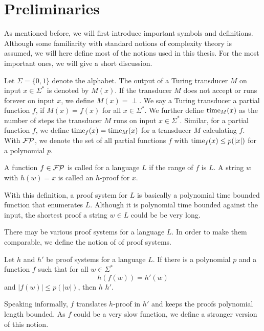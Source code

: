 \chapter{Preliminaries}
  As mentioned before, we will first introduce important symbols and definitions. Although some familiarity with standard notions of complexity theory is assumed, we will here define most of the notions used in this thesis. For the most important ones, we will give a short discussion.

  Let \(\Sigma = \{ 0, 1 \}\) denote the alphabet. The output of a Turing transducer \(M\) on input \(x \in \Sigma^*\) is denoted by \(M(x)\). If the transducer \(M\) does not accept or runs forever on input \(x\), we define \(M(x) = \perp\). We say a Turing transducer  a partial function \(f\), if \(M(x) = f(x)\) for all \(x \in \Sigma^*\). We further define \(\operatorname{time}_M(x)\) as the number of steps the transducer \(M\) runs on input \(x \in \Sigma^*\). Similar, for a partial function \(f\), we define \(\operatorname{time}_f(x) = \operatorname{time}_M(x)\) for a transducer \(M\) calculating \(f\).  With \(\mathcal{FP}\), we denote the set of all partial functions \(f\) with \(\operatorname{time}_f(x) \leq p(|x|)\) for a polynomial \(p\).

  \begin{definition}
    A function \(f \in \mathcal{FP}\) is called  for a language \(L\) if the range of \(f\) is \(L\). A string \(w\) with \(h(w) = x\) is called an \(h\)-proof for \(x\).
  \end{definition}

  With this definition, a proof system for \(L\) is basically a polynomial time bounded function that enumerates \(L\). Although it is polynomial time bounded against the input, the shortest proof a string \(w \in L\) could be be very long.

  There may be various proof systems for a language \(L\). In order to make them comparable, we define the notion of  of proof systems.
  
  \begin{definition}
    Let \(h\) and \(h'\) be proof systems for a language \(L\). If there is a polynomial \(p\) and a function \(f\) such that for all \(w \in \Sigma^*\)
      \[
        h(f(w)) = h'(w)
      \]
    and \(|f(w)| \leq p(|w|)\), then \(h\)  \(h'\).
  \end{definition}

  Speaking informally, \(f\) translates \(h\)-proof in \(h'\) and keeps the proofs polynomial length bounded. As \(f\) could be a very slow function, we define a stronger version of this notion.

